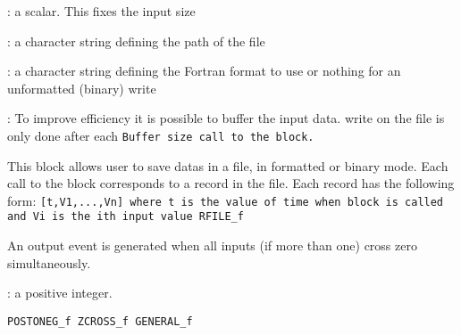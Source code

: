 \begin{scitem}
\item[{\verb?number of inputs?}]
: a scalar. This fixes the input size
\item[{\verb?Output file name?}]
: a character string defining the path of the file 
\item[{\verb?Output Format?}]
: a character string defining the Fortran format to use or nothing for
an unformatted (binary) write
\item[{\verb?Buffer size?}]
: To improve efficiency it is possible to buffer the input data. write
on the file is only done after each %
\tt Buffer size %
\rm call to the block.
\end{scitem}%
This block allows user to save datas in a file, in formatted or binary
mode.
Each call to the block corresponds to a record in the file. Each
record has the following form:
%
\tt [t,V1,...,Vn] %
\rm where %
\tt t %
\rm is the value of time when block is
called  and %
\tt Vi %
\rm is the ith input value
{\verb?RFILE_f?} \pageref{RFILEf}









%
%


\label{ZCROSSf}

An output event is generated when all inputs (if more than one)
cross zero simultaneously.
\begin{scitem}
\item[{\verb?Number of inputs?}]
: a positive integer.
\end{scitem}%
{\verb?POSTONEG_f ZCROSS_f GENERAL_f?} \pageref{POSTONEGfZCROSSfGENERALf}









%
%


